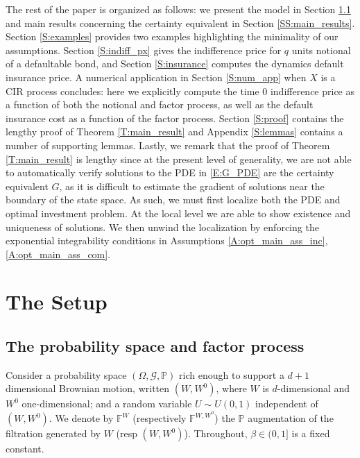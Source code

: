 \documentclass[11pt, letterpaper]{amsart}
\theoremstyle{definition}
\theoremstyle{remark}
\numberwithin{equation}{section}
\newcommand{\prob}{\mathbb{P}}
\newcommand{\G}{\mathcal{G}}
\newcommand{\filt}{\mathbb{F}}
\begin{document}
The rest of the paper is organized as follows: we present the model in Section \ref{SS:model} and main results concerning the certainty equivalent in Section \ref{SS:main_results}.  Section \ref{S:examples} provides two examples highlighting the minimality of our assumptions.  Section \ref{S:indiff_px} gives the indifference price for $q$ units notional of a defaultable bond, and Section \ref{S:insurance} computes the dynamics default insurance price.  A numerical application in Section \ref{S:num_app} when $X$ is a CIR process concludes: here we explicitly compute the time 0 indifference price as a function of both the notional and factor process, as well as the default insurance cost as a function of the factor process.  Section \ref{S:proof} contains the lengthy proof of Theorem \ref{T:main_result} and Appendix \ref{S:lemmas} contains a number of supporting lemmas. Lastly, we remark that the proof of Theorem \ref{T:main_result} is lengthy since at the present level of generality, we are not able to automatically verify solutions to the PDE in \eqref{E:G_PDE} are the certainty equivalent $G$, as it is difficult to estimate the gradient of solutions near the boundary of the state space.  As such, we must first localize both the PDE and optimal investment problem. At the local level we are able to show existence and uniqueness of solutions.  We then unwind the localization by enforcing the exponential integrability conditions in Assumptions \ref{A:opt_main_ass_inc}, \ref{A:opt_main_ass_com}.



\section{The Setup}\label{S:setup}

\subsection{The probability space and factor process}\label{SS:model}
Consider a probability space $(\Omega,\G,\prob)$ rich enough to support a $d+1$ dimensional Brownian motion, written $(W,W^0)$, where $W$ is $d$-dimensional and $W^0$ one-dimensional; and a random variable $U\sim U(0,1)$ independent of $(W,W^0)$. We denote by $\filt^W$ (respectively $\filt^{W,W^0}$) the $\prob$ augmentation of the filtration generated by $W$ (resp $(W,W^0)$). Throughout,  $\beta\in (0,1]$ is a fixed constant.
\end{document}
